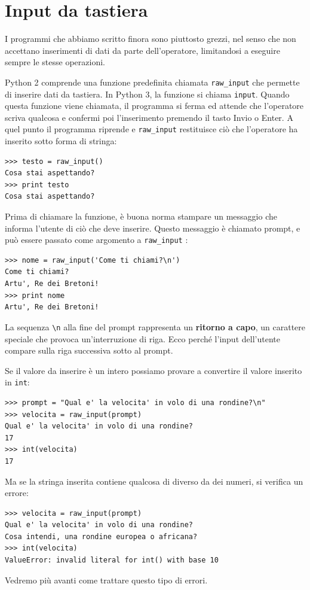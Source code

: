\documentclass[10pt]{book}
\begin{document}
\section{Input da tastiera}

I programmi che abbiamo scritto finora sono piuttosto grezzi, nel senso che non accettano inserimenti di dati da parte dell'operatore, limitandosi a eseguire sempre le stesse operazioni.

Python 2 comprende una funzione predefinita chiamata \verb"raw_input" che permette di inserire dati da tastiera. In Python 3, la funzione si chiama
  {\tt input}. Quando questa funzione viene chiamata, il programma si ferma ed attende che l'operatore scriva qualcosa e confermi poi l'inserimento premendo il tasto {\sf Invio} o {\sf Enter}. A quel punto il programma riprende e \verb"raw_input" restituisce ciò che l'operatore ha inserito sotto forma di stringa:

\begin{verbatim}
>>> testo = raw_input()
Cosa stai aspettando?
>>> print testo
Cosa stai aspettando?
\end{verbatim}
%
Prima di chiamare la funzione, è buona norma stampare un messaggio che informa l'utente di ciò che deve inserire. Questo messaggio è chiamato prompt, e può essere passato come argomento a \verb"raw_input" :

\begin{verbatim}
>>> nome = raw_input('Come ti chiami?\n')
Come ti chiami?
Artu', Re dei Bretoni!
>>> print nome
Artu', Re dei Bretoni!
\end{verbatim}
%
La sequenza \verb"\n" alla fine del prompt rappresenta un {\bf ritorno a capo},
un carattere speciale che provoca un'interruzione di riga. Ecco perché l'input dell'utente compare sulla riga successiva sotto al prompt.

Se il valore da inserire è un intero possiamo provare a convertire il valore inserito in {\tt int}:

\begin{verbatim}
>>> prompt = "Qual e' la velocita' in volo di una rondine?\n"
>>> velocita = raw_input(prompt)
Qual e' la velocita' in volo di una rondine?
17
>>> int(velocita)
17
\end{verbatim}
%
Ma se la stringa inserita contiene qualcosa di diverso da dei numeri, si verifica un errore:

\begin{verbatim}
>>> velocita = raw_input(prompt)
Qual e' la velocita' in volo di una rondine?
Cosa intendi, una rondine europea o africana?
>>> int(velocita)
ValueError: invalid literal for int() with base 10
\end{verbatim}
%
Vedremo più avanti come trattare questo tipo di errori.
\end{document}
